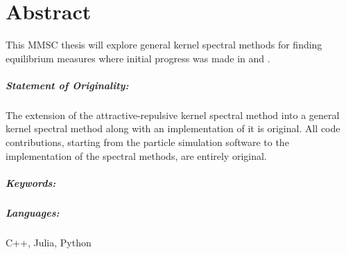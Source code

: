 \chapter*{Abstract}
\label{chap:abstract}
This MMSC thesis will explore general kernel spectral methods for finding equilibrium measures where initial progress was made in \cite{2020-power-law-kernels} and \cite{2021-arbitrary-dimensions}.
\hierKoennteIhreWerbungStehen

\paragraph{Statement of Originality:}
The extension of the attractive-repulsive kernel spectral method into a general kernel spectral method along with an implementation of it is original.
All code contributions, starting from the particle simulation software to the implementation of the spectral methods, are entirely original.

\paragraph{Keywords:}
\thesiskeywords

\paragraph{Languages:}
C++, Julia, Python

